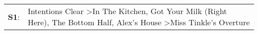 \begin{supertabular}{p{0.03\textwidth}p{0.92\textwidth}}
 \textbf{S1}:  &  Intentions Clear\textsuperscript{} \textgreater \enspace In The Kitchen\textsuperscript{}, \enspace Got Your Milk (Right Here)\textsuperscript{}, \enspace The Bottom Half\textsuperscript{}, \enspace Alex's House\textsuperscript{} \textgreater \enspace Miss Tinkle's Overture\textsuperscript{}  \enspace  \\
\end{supertabular}
